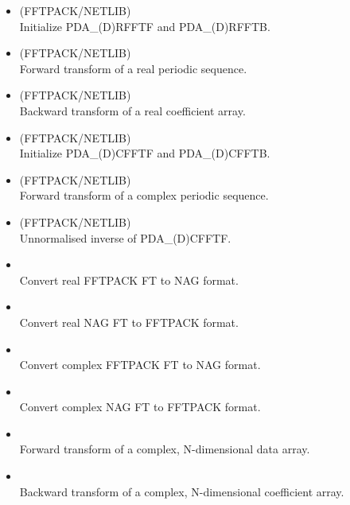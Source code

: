 \documentclass[11pt,twoside,nolof]{starlink}
\begin{document}
\begin{itemize}

\item {} (FFTPACK/NETLIB)\ \\
   Initialize PDA\_(D)RFFTF and PDA\_(D)RFFTB.
\item {} (FFTPACK/NETLIB)\ \\
   Forward transform of a real periodic sequence.
\item {} (FFTPACK/NETLIB)\ \\
   Backward transform of a real coefficient array.
\item {} (FFTPACK/NETLIB)\ \\
   Initialize PDA\_(D)CFFTF and PDA\_(D)CFFTB.
\item {} (FFTPACK/NETLIB)\ \\
   Forward transform of a complex periodic sequence.
\item {} (FFTPACK/NETLIB)\ \\
   Unnormalised inverse of PDA\_(D)CFFTF.

\item {}\ \\
   Convert real FFTPACK FT to NAG format.
\item {}\ \\
   Convert real NAG FT to FFTPACK format.
\item {}\ \\
   Convert complex FFTPACK FT to NAG format.
\item {}\ \\
   Convert complex NAG FT to FFTPACK format.

\item {}\ \\
   Forward transform of a complex, N-dimensional data array.
\item {}\ \\
   Backward transform of a complex, N-dimensional coefficient array.

\end{itemize}
\end{document}
